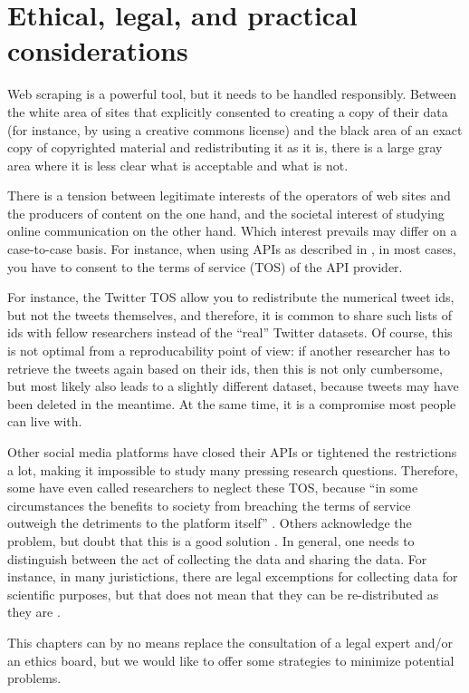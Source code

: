 \section{Ethical, legal, and practical considerations}
\label{sec:ethicallegalpractical}
Web scraping is a powerful tool, but it needs to be handled
responsibly. Between the white area of sites that explicitly consented
to creating a copy of their data (for instance, by using a creative
commons license) and the black area of an exact copy of copyrighted
material and redistributing it as it is, there is a large gray area
where it is less clear what is acceptable and what is not.

There is a tension between legitimate interests of the operators of
web sites and the producers of content on the one hand, and the
societal interest of studying online communication on the other
hand. Which interest prevails may differ on a case-to-case basis. For
instance, when using APIs as described in , in most
cases, you have to consent to the terms of service (TOS) of the API
provider.

For instance, the Twitter TOS allow you to redistribute the numerical
tweet ids, but not the tweets themselves, and therefore, it is common
to share such lists of ids with fellow researchers instead of the
``real'' Twitter datasets. Of course, this is not optimal from a
reproducability point of view: if another researcher has to retrieve
the tweets again based on their ids, then this is not only cumbersome,
but most likely also leads to a slightly different dataset, because
tweets may have been deleted in the meantime. At the same time, it is
a compromise most people can live with.

Other social media platforms have closed their APIs or tightened the
restrictions a lot, making it impossible to study many pressing
research questions. Therefore, some have even called researchers to
neglect these TOS, because ``in some circumstances the benefits to
society from breaching the terms of service outweigh the detriments to
the platform itself'' \citep[p.~1561]{Bruns2019}. Others acknowledge
the problem, but doubt that this is a good solution
\citep{Puschmann2019}.
In general, one needs to distinguish between the act of collecting the
data and sharing the data. For instance, in many juristictions, there
are legal excemptions for collecting data for scientific purposes, but
that does not mean that they can be re-distributed as they are
\citep{VanAtteveldt2019}.

This chapters can by no means replace the consultation of a legal
expert and/or an ethics board, but we would like to offer some
strategies to minimize potential problems.

